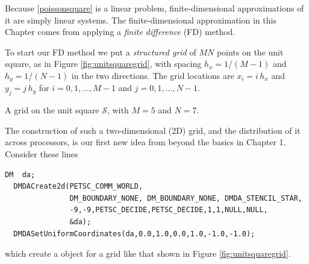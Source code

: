 Because \eqref{poissonsquare} is a linear problem, finite-dimensional approximations of it are simply linear systems.  The finite-dimensional approximation in this Chapter comes from applying a \emph{finite difference} (FD) method.

To start our FD method we put a \emph{structured grid} of $MN$ points on the unit square, as in Figure \ref{fig:unitsquaregrid}, with spacing $h_x=1/(M-1)$ and $h_y=1/(N-1)$ in the two directions.  The grid locations are $x_i = i\, h_x$ and $y_j = j\, h_y$ for $i = 0,1,\dots,M-1$ and $j=0,1,\dots,N-1$.

\begin{marginfigure}
\caption{A grid on the unit square $\mathcal{S}$, with $M=5$ and $N=7$.}
\label{fig:unitsquaregrid}
\end{marginfigure}

The construction of such a two-dimensional (2D) grid, and the distribution of it across processors, is our first new idea from \PETSc beyond the basics in Chapter 1.  Consider these lines
\begin{Verbatim}[fontsize=\small]
  DM  da;
  DMDACreate2d(PETSC_COMM_WORLD,
               DM_BOUNDARY_NONE, DM_BOUNDARY_NONE, DMDA_STENCIL_STAR,
               -9,-9,PETSC_DECIDE,PETSC_DECIDE,1,1,NULL,NULL,
               &da);
  DMDASetUniformCoordinates(da,0.0,1.0,0.0,1.0,-1.0,-1.0);
\end{Verbatim}
\medskip\noindent
which create a \PETSc \pDM object for a grid like that shown in Figure \ref{fig:unitsquaregrid}.

